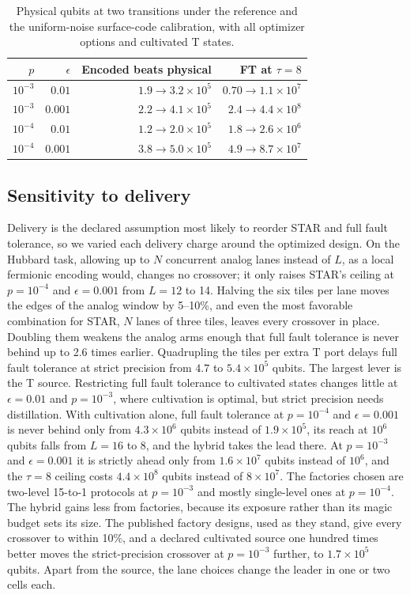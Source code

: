 \documentclass[11pt]{article}
\newcommand{\eps}{\epsilon}
\begin{document}
\begin{table}[!htbp]
\centering
\small
\begin{tabular}{@{}rrrr@{}}
\toprule
$p$ & $\eps$ & Encoded beats physical & FT at $\tau=8$\\
\midrule
$10^{-3}$ & $0.01$ & $1.9\to3.2\times10^5$ & $0.70\to1.1\times10^7$\\
$10^{-3}$ & $0.001$ & $2.2\to4.1\times10^5$ & $2.4\to4.4\times10^8$\\
$10^{-4}$ & $0.01$ & $1.2\to2.0\times10^5$ & $1.8\to2.6\times10^6$\\
$10^{-4}$ & $0.001$ & $3.8\to5.0\times10^5$ & $4.9\to8.7\times10^7$\\
\bottomrule
\end{tabular}
\caption{Physical qubits at two transitions under the reference and the
uniform-noise surface-code calibration, with all optimizer options and cultivated T
states.}\label{tab:law-sensitivity}
\end{table}

\subsection{Sensitivity to delivery}\label{sec:delivery-sensitivity}
Delivery is the declared assumption most likely to reorder STAR and full fault
tolerance, so we varied each delivery charge around the optimized design. On the
Hubbard task, allowing up to $N$ concurrent analog lanes instead of $L$, as a
local fermionic encoding would, changes no crossover; it only raises STAR's
ceiling at $p=10^{-4}$ and $\eps=0.001$ from $L=12$ to 14. Halving the six tiles
per lane moves the edges of the analog window by 5--10\%, and even the most
favorable combination for STAR, $N$ lanes of three tiles, leaves every crossover
in place. Doubling them weakens the analog arms enough that full fault tolerance
is never behind up to 2.6 times earlier. Quadrupling the tiles per extra T port
delays full fault tolerance at strict precision from $4.7$ to $5.4\times10^5$
qubits. The largest lever is the T source. Restricting full fault tolerance to
cultivated states changes little at $\eps=0.01$ and $p=10^{-3}$, where
cultivation is optimal, but strict precision needs distillation. With
cultivation alone, full fault tolerance at $p=10^{-4}$ and $\eps=0.001$ is never
behind only from $4.3\times10^6$ qubits instead of $1.9\times10^5$, its reach at
$10^6$ qubits falls from $L=16$ to 8, and the hybrid takes the lead there. At
$p=10^{-3}$ and $\eps=0.001$ it is strictly ahead only from $1.6\times10^7$ qubits
instead of $10^6$, and the $\tau=8$ ceiling costs $4.4\times10^8$ qubits instead of
$8\times10^7$. The factories chosen are two-level 15-to-1 protocols at
$p=10^{-3}$ and mostly single-level ones at $p=10^{-4}$. The hybrid gains less
from factories, because its exposure rather than its magic budget sets its
size. The published factory designs, used as they stand, give every crossover
to within 10\%, and a declared cultivated source one hundred times better moves
the strict-precision crossover at $p=10^{-3}$ further, to $1.7\times10^5$ qubits.
Apart from the source, the lane choices change the leader in one or two cells
each.
\end{document}
